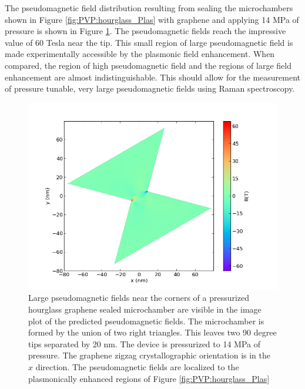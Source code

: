 The pseudomagnetic field distribution resulting from sealing the microchambers shown in Figure \ref{fig:PVP:hourglass_Plas} with graphene and applying 14 MPa of pressure is shown in Figure \ref{fig:PVP:hourglass_PMF}.
The pseudomagnetic fields reach the impressive value of 60 Tesla near the tip.
This small region of large pseudomagnetic field is made experimentally accessible by the plasmonic field enhancement.
When compared, the region of high pseudomagnetic field and the regions of large field enhancement are almost indistinguishable.
This should allow for the measurement of pressure tunable, very large pseudomagnetic fields using Raman spectroscopy.

\begin{figure} 
  \begin{center}
  \includegraphics[scale=.75]{Figs_PVP/HourGlass_PMF.png}
  \end{center}
  \caption[Large, localized pseudomagnetic fields in a pressurized, hourglass, gra\-phene sealed microchamber]{\label{fig:PVP:hourglass_PMF}
  Large pseudomagnetic fields near the corners of a pressurized hourglass graphene sealed microchamber are visible in the image plot of the predicted pseudomagnetic fields.
  The microchamber is formed by the union of two right triangles.
  This leaves two 90 degree tips separated by 20 nm.
  The device is pressurized to 14 MPa of pressure.
  The graphene zigzag crystallographic orientation is in the $\hat{x}$ direction.
  The pseudomagnetic fields are localized to the plasmonically enhanced regions of Figure \ref{fig:PVP:hourglass_Plas}}
\end{figure}

